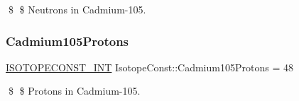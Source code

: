 \$ \$ Neutrons in Cadmium-\/105. \mbox{\label{group___isotope_const-_cadmium-_cd105_ga518a853d860a266976d85a059fffcebc}} 
\subsubsection{\texorpdfstring{Cadmium105\+Protons}{Cadmium105Protons}}
{\footnotesize\ttfamily \mbox{\hyperlink{group___isotope_const-_macros_ga5f18360b3e99483a35c32d789e62621c}{I\+S\+O\+T\+O\+P\+E\+C\+O\+N\+S\+T\+\_\+\+I\+NT}} Isotope\+Const\+::\+Cadmium105\+Protons = 48}

\$ \$ Protons in Cadmium-\/105. 